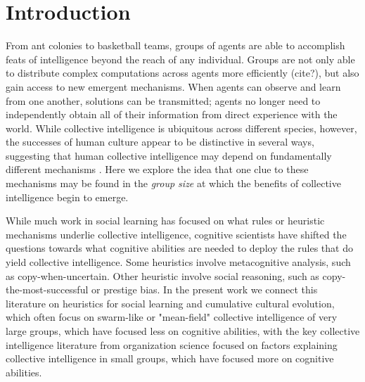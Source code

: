 \documentclass[12pt,letterpaper]{article}
\begin{document}
\section{Introduction}

From ant colonies to basketball teams, groups of agents are able to accomplish feats of intelligence beyond the reach of any individual.
Groups are not only able to distribute complex computations across agents more efficiently (cite?), but also gain access to new emergent mechanisms. 
When agents can observe and learn from one another, solutions can be transmitted; agents no longer need to independently obtain all of their information from direct experience with the world.
While collective intelligence is ubiquitous across different species, however, the successes of human culture appear to be distinctive in several ways, suggesting that human collective intelligence may depend on fundamentally different mechanisms \cite{tomasello_natural_2014, henrich2017secret, laland2017darwin}.
Here we explore the idea that one clue to these mechanisms may be found in the \emph{group size} at which the benefits of collective intelligence begin to emerge.

While much work in social learning has focused on what rules or heuristic mechanisms underlie collective intelligence, cognitive scientists have shifted the questions towards what cognitive abilities are needed to deploy the rules that do yield collective intelligence.  Some heuristics involve metacognitive analysis, such as copy-when-uncertain. Other heuristic involve social reasoning, such as copy-the-most-successful or prestige bias.  In the present work we connect this literature on heuristics for social learning and cumulative cultural evolution, which often focus on swarm-like or "mean-field" collective intelligence of very large groups, which have focused less on cognitive abilities, with the key collective intelligence literature from organization science focused on factors explaining collective intelligence in small groups, which have focused more on cognitive abilities.
\end{document}
